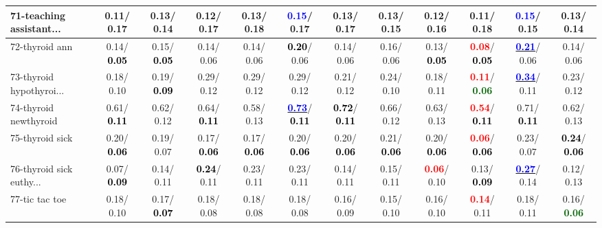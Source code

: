 \begin{table}[h]
\begin{center}
{\begin{tabular}{lc|c|c|c|c|c|c|c|c|c|c}
71-teaching assistant... &   0.11/  0.17 &   0.13/  0.14 &   0.12/  0.17 &   0.13/  0.18 & \textcolor{blue}{\textbf{  0.15}}/  0.17 &   0.13/  0.17 &   0.13/  0.15 &   0.12/  0.16 &   0.11/  0.18 & \textcolor{blue}{\textbf{  0.15}}/  0.15 &   0.13/  0.14 \\ \hline
72-thyroid ann &   0.14/\textcolor{black}{\textbf{  0.05}} &   0.15/\textcolor{black}{\textbf{  0.05}} &   0.14/  0.06 &   0.14/  0.06 & \textcolor{black}{\textbf{  0.20}}/  0.06 &   0.14/  0.06 &   0.16/  0.06 &   0.13/\textcolor{black}{\textbf{  0.05}} & \textcolor{red}{\textbf{  0.08}}/\textcolor{black}{\textbf{  0.05}} & \underline{\textcolor{blue}{\textbf{  0.21}}}/  0.06 &   0.14/  0.06 \\
73-thyroid hypothyroi... &   0.18/  0.10 &   0.19/\textcolor{black}{\textbf{  0.09}} &   0.29/  0.12 &   0.29/  0.12 &   0.29/  0.12 &   0.21/  0.12 &   0.24/  0.10 &   0.18/  0.11 & \textcolor{red}{\textbf{  0.11}}/\textcolor{darkgreen}{\textbf{  0.06}} & \underline{\textcolor{blue}{\textbf{  0.34}}}/  0.11 &   0.23/  0.12 \\
74-thyroid newthyroid &   0.61/\textcolor{black}{\textbf{  0.11}} &   0.62/  0.12 &   0.64/\textcolor{black}{\textbf{  0.11}} &   0.58/  0.13 & \underline{\textcolor{blue}{\textbf{  0.73}}}/\textcolor{black}{\textbf{  0.11}} & \textcolor{black}{\textbf{  0.72}}/\textcolor{black}{\textbf{  0.11}} &   0.66/  0.12 &   0.63/  0.13 & \textcolor{red}{\textbf{  0.54}}/\textcolor{black}{\textbf{  0.11}} &   0.71/\textcolor{black}{\textbf{  0.11}} &   0.62/  0.13 \\
75-thyroid sick &   0.20/\textcolor{black}{\textbf{  0.06}} &   0.19/  0.07 &   0.17/\textcolor{black}{\textbf{  0.06}} &   0.17/\textcolor{black}{\textbf{  0.06}} &   0.20/\textcolor{black}{\textbf{  0.06}} &   0.20/\textcolor{black}{\textbf{  0.06}} &   0.21/\textcolor{black}{\textbf{  0.06}} &   0.20/\textcolor{black}{\textbf{  0.06}} & \textcolor{red}{\textbf{  0.06}}/\textcolor{black}{\textbf{  0.06}} &   0.23/  0.07 & \textcolor{black}{\textbf{  0.24}}/\textcolor{black}{\textbf{  0.06}} \\
76-thyroid sick euthy... &   0.07/\textcolor{black}{\textbf{  0.09}} &   0.14/  0.11 & \textcolor{black}{\textbf{  0.24}}/  0.11 &   0.23/  0.11 &   0.23/  0.11 &   0.14/  0.11 &   0.15/  0.11 & \textcolor{red}{\textbf{  0.06}}/  0.10 &   0.13/\textcolor{black}{\textbf{  0.09}} & \underline{\textcolor{blue}{\textbf{  0.27}}}/  0.14 &   0.12/  0.13 \\
77-tic tac toe &   0.18/  0.10 &   0.17/\textcolor{black}{\textbf{  0.07}} &   0.18/  0.08 &   0.18/  0.08 &   0.18/  0.08 &   0.16/  0.09 &   0.15/  0.10 &   0.16/  0.10 & \textcolor{red}{\textbf{  0.14}}/  0.11 &   0.18/  0.11 &   0.16/\textcolor{darkgreen}{\textbf{  0.06}} \\

\end{tabular}}
\end{center}
\end{table}
